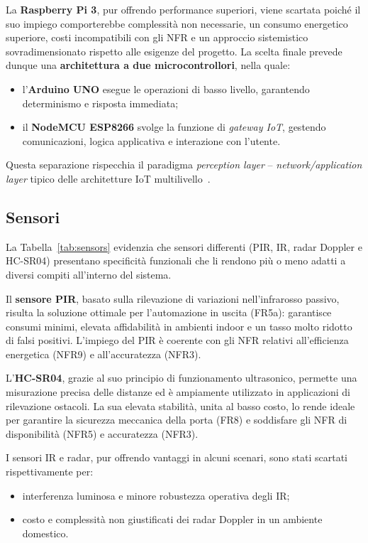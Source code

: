   La \textbf{Raspberry Pi 3}, pur offrendo performance superiori, viene scartata poiché il suo impiego comporterebbe complessità non necessarie, un consumo energetico superiore, costi incompatibili con gli NFR e un approccio sistemistico sovradimensionato rispetto alle esigenze del progetto. La scelta finale prevede dunque una \textbf{architettura a due microcontrollori}, nella quale: \begin{itemize} \item l’\textbf{Arduino UNO} esegue le operazioni di basso livello, garantendo determinismo e risposta immediata; \item il \textbf{NodeMCU ESP8266} svolge la funzione di \textit{gateway IoT}, gestendo comunicazioni, logica applicativa e interazione con l’utente. \end{itemize} Questa separazione rispecchia il paradigma \textit{perception layer} – \textit{network/application layer} tipico delle architetture IoT multilivello~\cite{Holler2014}. 
  
  \subsection{Sensori}
  
   La Tabella~\ref{tab:sensors} evidenzia che sensori differenti (PIR, IR, radar Doppler e HC-SR04) presentano specificità funzionali che li rendono più o meno adatti a diversi compiti all’interno del sistema. 
   
   Il \textbf{sensore PIR}, basato sulla rilevazione di variazioni nell’infrarosso passivo, risulta la soluzione ottimale per l’automazione in uscita (FR5a): garantisce consumi minimi, elevata affidabilità in ambienti indoor e un tasso molto ridotto di falsi positivi. L’impiego del PIR è coerente con gli NFR relativi all’efficienza energetica (NFR9) e all’accuratezza (NFR3). 
   
   L’\textbf{HC-SR04}, grazie al suo principio di funzionamento ultrasonico, permette una misurazione precisa delle distanze ed è ampiamente utilizzato in applicazioni di rilevazione ostacoli. La sua elevata stabilità, unita al basso costo, lo rende ideale per garantire la sicurezza meccanica della porta (FR8) e soddisfare gli NFR di disponibilità (NFR5) e accuratezza (NFR3). 
   
   I sensori IR e radar, pur offrendo vantaggi in alcuni scenari, sono stati scartati rispettivamente per: \begin{itemize} \item interferenza luminosa e minore robustezza operativa degli IR; \item costo e complessità non giustificati dei radar Doppler in un ambiente domestico. \end{itemize} 
   
